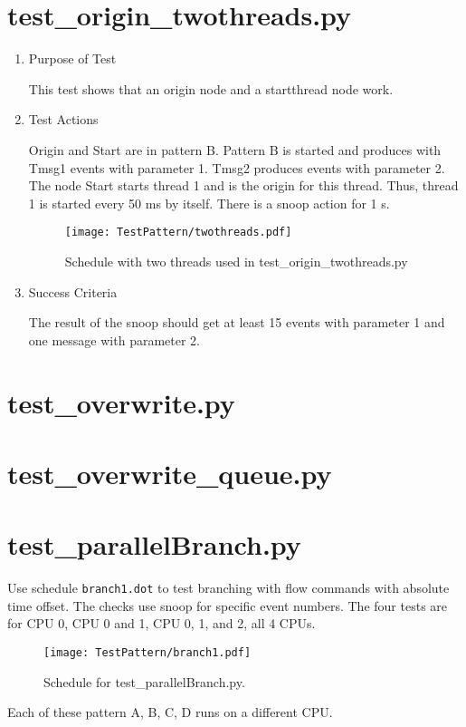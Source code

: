 \documentclass[12pt,a4paper]{report}
\begin{document}
\section{test\_origin\_twothreads.py}
\begin{enumerate}
  \item Purpose of Test

  This test shows that an origin node and a startthread node work.
  \item Test Actions

  Origin and Start are in pattern B.
  Pattern B is started and produces with Tmsg1 events with parameter 1. Tmsg2 produces events with parameter 2.
  The node Start starts thread 1 and is the origin for this thread. Thus, thread 1 is started every 50 ms by itself.
  There is a snoop action for 1 s.
    \begin{figure}
        \centering
        \texttt{[image: TestPattern/twothreads.pdf]}
        \caption{Schedule with two threads used in test\_origin\_twothreads.py}
        \label{fig:schedule_twoThreads}
    \end{figure}
  \item Success Criteria

  The result of the snoop should get at least 15 events with parameter 1 and one message with parameter 2.
\end{enumerate}

\section{test\_overwrite.py}

\section{test\_overwrite\_queue.py}

\section{test\_parallelBranch.py}
Use schedule \texttt{branch1.dot} to test branching with flow commands
with absolute time offset. The checks use snoop for specific event numbers.
The four tests are for CPU 0, CPU 0 and 1, CPU 0, 1, and 2, all 4 CPUs.
    \begin{figure}
        \centering
        \texttt{[image: TestPattern/branch1.pdf]}
        \caption{Schedule for test\_parallelBranch.py.}
        \label{fig:Pattern_for_test_parallelBranch}
    \end{figure}
    Each of these pattern A, B, C, D runs on a different CPU.
\end{document}
